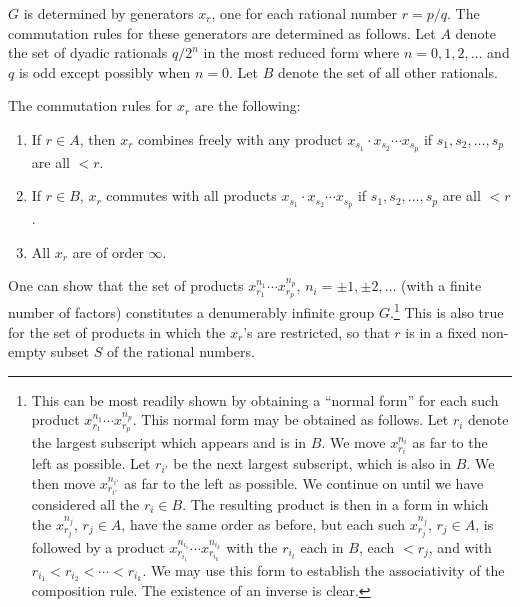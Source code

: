 \documentclass[b5paper,twoside]{article}
\theoremstyle{mvnplain}
\def\mathfrak#1{#1}%
\begin{document}
$\mathfrak G$ is determined by generators $x_r$, one for each rational number
$r=p/q$. The commutation rules for these generators are determined as follows.
Let $A$ denote the set of dyadic rationals $q/2^n$ in the most reduced form
where $n=0,1,2,\ldots$ and $q$ is odd except possibly when $n=0$. Let $B$
denote the set of all other rationals.

The commutation rules for $x_r$ are the following:
\begin{enumerate}[label=(\roman*),leftmargin=3em]
\item If $r\in A$, then $x_r$ combines freely with any product
$x_{s_1}\cdot x_{s_2}\cdots x_{s_p}$ if $s_1,s_2,\ldots,s_p$ are all $<r$.
\item If $r\in B$, $x_r$ commutes with all products
$x_{s_1}\cdot x_{s_2}\cdots x_{s_p}$ if $s_1,s_2,\ldots,s_p$ are all $<r$.
\item All $x_r$ are of order $\infty$.
\end{enumerate}
One can show that the set of products
$x_{r_1}^{n_1}\cdots x_{r_p}^{n_p}$,
$n_i=\pm1,\pm2,\ldots$ (with a finite number of factors) constitutes a
denumerably infinite group $\mathfrak G$.\footnote{This can be most readily
shown by obtaining a ``normal form'' for each such product
$x_{r_1}^{n_1}\cdots x_{r_p}^{n_p}$. This normal form may be obtained as
follows. Let $r_i$ denote the largest subscript which appears and is in $B$.
We move $x_{r_i}^{n_i}$ as far to the left as possible. Let $r_{i'}$ be the
next largest subscript, which is also in $B$. We then move
$x_{r_{i'}}^{n_{i'}}$ as far to the left as possible. We continue on until we
have considered all the $r_i\in B$. The resulting product is then in a form in
which the $x_{r_j}^{n_j}$, $r_j\in A$, have the same order as before, but each
such $x_{r_j}^{n_j}$, $r_j\in A$, is followed by a product
$x_{r_{i_1}}^{n_{i_1}}\cdots x_{r_{i_k}}^{n_{i_k}}$ with the $r_{i_t}$ each
in $B$, each $<r_j$, and with $r_{i_1}<r_{i_2}<\cdots<r_{i_k}$. We may use
this form to establish the associativity of the composition rule. The
existence of an inverse is clear.} This is also true for the set of products
in which the $x_r$'s are restricted, so that $r$ is in a fixed non-empty
subset $S$ of the rational numbers.
\end{document}
